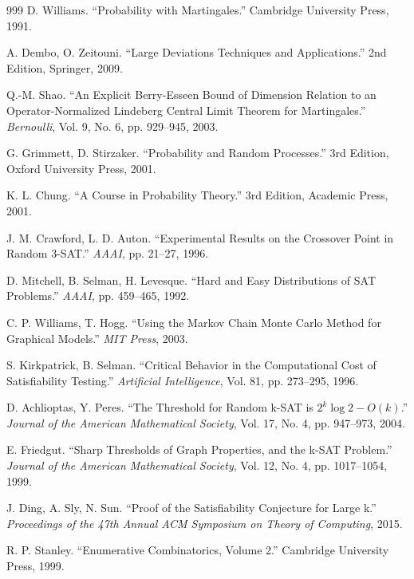 ﻿\documentclass[a4paper,12pt]{article}
\theoremstyle{definition}
\begin{document}
\begin{thebibliography}{999}
 D. Williams. ``Probability with Martingales.'' Cambridge University Press, 1991.

 A. Dembo, O. Zeitouni. ``Large Deviations Techniques and Applications.'' 2nd Edition, Springer, 2009.

 Q.-M. Shao. ``An Explicit Berry-Esseen Bound of Dimension Relation to an Operator-Normalized Lindeberg Central Limit Theorem for Martingales.'' \textit{Bernoulli}, Vol. 9, No. 6, pp. 929--945, 2003.

 G. Grimmett, D. Stirzaker. ``Probability and Random Processes.'' 3rd Edition, Oxford University Press, 2001.

 K. L. Chung. ``A Course in Probability Theory.'' 3rd Edition, Academic Press, 2001.


 J. M. Crawford, L. D. Auton. ``Experimental Results on the Crossover Point in Random 3-SAT.'' \textit{AAAI}, pp. 21--27, 1996.

 D. Mitchell, B. Selman, H. Levesque. ``Hard and Easy Distributions of SAT Problems.'' \textit{AAAI}, pp. 459--465, 1992.

 C. P. Williams, T. Hogg. ``Using the Markov Chain Monte Carlo Method for Graphical Models.'' \textit{MIT Press}, 2003.

 S. Kirkpatrick, B. Selman. ``Critical Behavior in the Computational Cost of Satisfiability Testing.'' \textit{Artificial Intelligence}, Vol. 81, pp. 273--295, 1996.

 D. Achlioptas, Y. Peres. ``The Threshold for Random k-SAT is $2^k \log 2 - O(k)$.'' \textit{Journal of the American Mathematical Society}, Vol. 17, No. 4, pp. 947--973, 2004.

 E. Friedgut. ``Sharp Thresholds of Graph Properties, and the k-SAT Problem.'' \textit{Journal of the American Mathematical Society}, Vol. 12, No. 4, pp. 1017--1054, 1999.

 J. Ding, A. Sly, N. Sun. ``Proof of the Satisfiability Conjecture for Large k.'' \textit{Proceedings of the 47th Annual ACM Symposium on Theory of Computing}, 2015.

 R. P. Stanley. ``Enumerative Combinatorics, Volume 2.'' Cambridge University Press, 1999.


\end{thebibliography}
\end{document}
